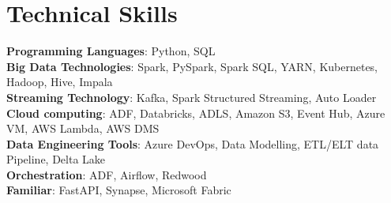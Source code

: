 \documentclass[letterpaper,11pt]{article}
\begin{document}
\section{Technical Skills}
 \begin{itemize}[leftmargin=0.15in, label={}]
    \small{\item{
     \textbf{Programming Languages}{:\hspace{0.06cm}  Python, SQL} \\
     \textbf{Big Data Technologies}{:\hspace{0.49cm}     Spark, PySpark, Spark SQL, YARN, Kubernetes, Hadoop, Hive, Impala } \\
     \textbf{Streaming Technology}{:\hspace{0.51cm} Kafka, Spark Structured Streaming, Auto Loader} \\
     \textbf{Cloud computing}{:\hspace{1.38cm} ADF, Databricks, ADLS, Amazon S3, Event Hub, Azure VM, AWS Lambda, AWS DMS } \\
     \textbf{Data Engineering Tools}{:\hspace{0.28cm} Azure DevOps, Data Modelling, ETL/ELT data Pipeline, Delta Lake}\\
     \textbf{Orchestration}{:\hspace{2.02cm} ADF, Airflow, Redwood} \\
     \textbf{Familiar}{:\hspace{3cm} FastAPI, Synapse, Microsoft Fabric} \\
     
     
    }}
 \end{itemize}

\end{document}
